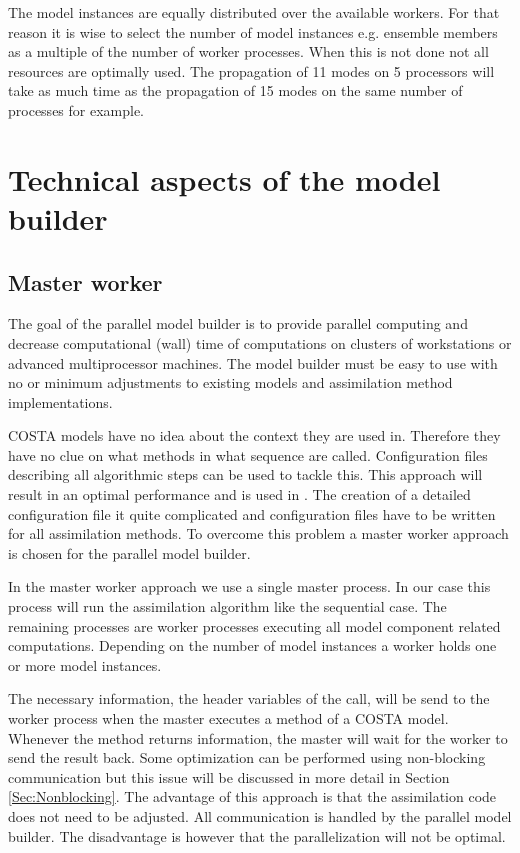 The model instances are equally distributed over the available workers. For
that reason it is wise to select the number of model instances e.g.
ensemble members as a multiple of the number of worker processes. When this
is not done not all resources are optimally used. The propagation of 11
modes on 5 processors will take as much time as the propagation of 15
modes on the same number of processes for example.


\section{Technical aspects of the model builder}
 \label{Sec:Technical aspects of the model builder}
\subsection{Master worker}
The goal of the parallel model builder is to provide parallel computing and
decrease computational (wall) time of computations on clusters of
workstations or advanced multiprocessor machines. The model builder must be
easy to use with no or minimum adjustments to existing models and
assimilation method implementations.

COSTA models have no idea about the context they are used in. Therefore
they have no clue on what methods in what sequence are called.
Configuration files describing all algorithmic steps can be used to tackle
this. This approach will result in an optimal performance and is used in
\cite{Roest2002}. The creation of a detailed configuration file
it quite complicated and configuration files have to be written
for all assimilation methods. To overcome this problem a master worker
approach is chosen for the parallel model builder.

In the master worker approach we use a single master process. In our case
this process will run the assimilation algorithm like the sequential case.
The remaining processes are worker processes executing all model component
related computations. Depending on the number of model instances a worker
holds one or more model instances.

The necessary information, the header variables of the call, will be send
to the worker process when the master executes a method of a COSTA model.
Whenever the method returns information, the master will wait for the
worker to send the result back. Some optimization can be performed using
non-blocking communication but this issue will be discussed in more detail
in Section \ref{Sec:Nonblocking}. The advantage of this approach is that
the assimilation code does not need to be adjusted. All communication is
handled by the parallel model builder. The disadvantage is however that the
parallelization will not be optimal. 

